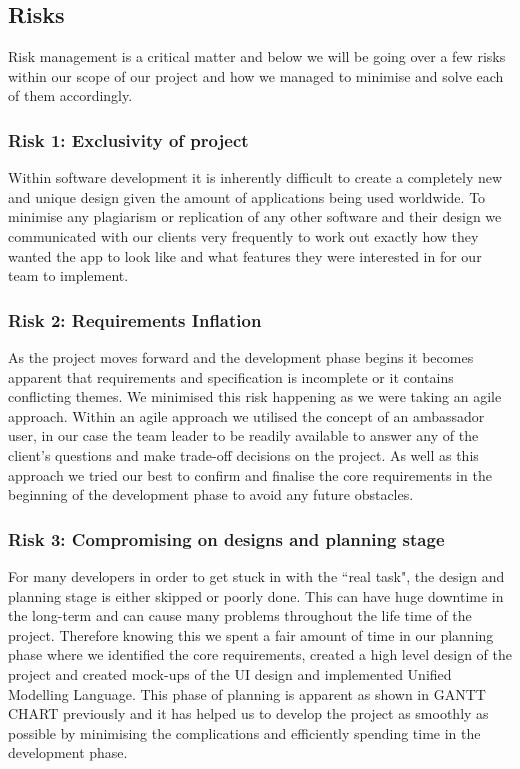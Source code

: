\documentclass[12pt]{article}
\begin{document}
\subsection{Risks}
Risk management is a critical matter and below we will be going over a few risks within our scope of our project and how we managed to minimise and solve each of them accordingly. 

\subsubsection{Risk 1: Exclusivity of project}
Within software development it is inherently difficult to create a completely new and unique design given the amount of applications being used worldwide. To minimise any plagiarism or replication of any other software and their design we communicated with our clients very frequently to work out exactly how they wanted the app to look like and what features they were interested in for our team to implement. 

\subsubsection{Risk 2: Requirements Inflation}
As the project moves forward and the development phase begins it becomes apparent that requirements and specification is incomplete or it contains conflicting themes. We minimised this risk happening as we were taking an agile approach. Within an agile approach we utilised the concept of an ambassador user, in our case the team leader to be readily available to answer any of the client’s questions and make trade-off decisions on the project. As well as this approach we tried our best to confirm and finalise the core requirements in the beginning of the development phase to avoid any future obstacles. 

\subsubsection{Risk 3: Compromising on designs and planning stage}
For many developers in order to get stuck in with the ``real task", the design and planning stage is either skipped or poorly done. This can have huge downtime in the long-term and can cause many problems throughout the life time of the project. Therefore knowing this we spent a fair amount of time in our planning phase where we identified the core requirements, created a high level design of the project and created mock-ups of the UI design and implemented Unified Modelling Language. This phase of planning is apparent as shown in GANTT CHART previously and it has helped us to develop the project as smoothly as possible by minimising the complications and efficiently spending time in the development phase. 
\end{document}
